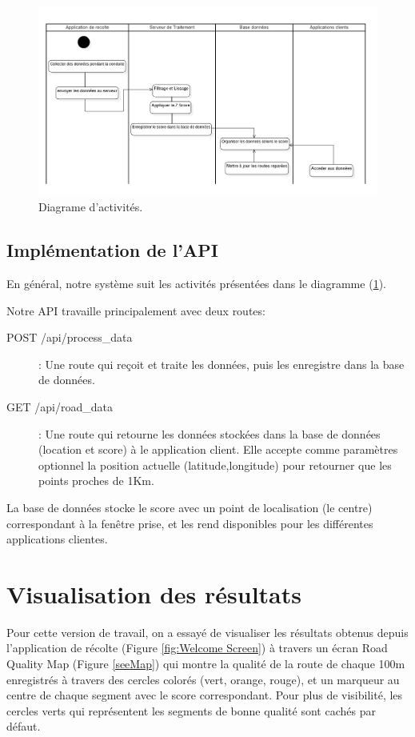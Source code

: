\begin{figure}[h!]
    \center
    \includegraphics[width=\textwidth]{Images/chapter3/activityDiagram.png}
    \caption{Diagrame d'activités.}
    \label{activityDiagram}
  \end{figure}

  \subsection{Implémentation de l’API}
  En général, notre système suit les activités présentées dans le diagramme (\ref{activityDiagram}).
  
  
  
  Notre API travaille principalement avec deux routes:
  \begin{description}
    \item[POST /api/process\_data] : Une route qui reçoit et traite les données, puis les enregistre dans la base de données.
    \item[GET /api/road\_data] : Une route qui retourne les données stockées dans la base de données (location et score) à le application client. Elle accepte comme paramètres optionnel la position actuelle (latitude,longitude) pour retourner que les points proches de 1Km.
\end{description}

La base de données stocke le score avec un point de localisation (le centre) correspondant à la fenêtre prise, et les rend disponibles pour les différentes applications clientes.

\section{Visualisation des résultats}
Pour cette version de travail, on a essayé de visualiser les résultats obtenus depuis l’application de récolte (Figure \ref{fig:Welcome Screen}) à travers un écran Road Quality Map (Figure \ref{seeMap}) qui montre la qualité de la route de chaque 100m enregistrés à travers des cercles colorés (vert, orange, rouge), et un marqueur au centre de chaque segment avec le score correspondant. Pour plus de visibilité, les cercles verts qui représentent les segments de bonne qualité sont
cachés par défaut.


